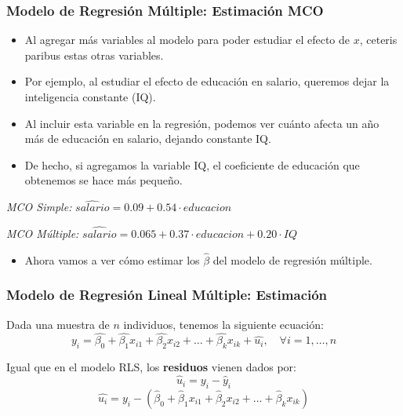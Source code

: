 \documentclass{beamer}
\begin{document}
\begin{frame}
\frametitle{Modelo de Regresión Múltiple: Estimación MCO}

\begin{itemize}
  \item Al agregar más variables al modelo para poder estudiar el efecto de $x$, ceteris paribus estas otras variables.
  
  \item Por ejemplo, al estudiar el efecto de educación en salario, queremos dejar la inteligencia constante (IQ).
  
  \item Al incluir esta variable en la regresión, podemos ver cuánto afecta un año más de educación en salario, dejando constante IQ.
  
  \item De hecho, si agregamos la variable IQ, el coeficiente de educación que obtenemos se hace más pequeño.
\end{itemize}

\begin{center}
    \textit{MCO Simple:} 
    $
    \hat{salario} = 0.09 + 0.54 \cdot educacion
    $ \\
    \vspace{0.5cm} %
    
    \textit{MCO Múltiple:} 
    $
    \hat{salario} = 0.065 + 0.37 \cdot educacion + 0.20 \cdot IQ
    $
\end{center}


\begin{itemize}
  \item Ahora vamos a ver cómo estimar los $\hat{\beta}$ del modelo de regresión múltiple.
\end{itemize}
\end{frame}
\begin{frame}
\frametitle{Modelo de Regresión Lineal Múltiple: Estimación}

Dada una muestra de $n$ individuos, tenemos la siguiente ecuación:
\[
y_i = \hat{\beta_0} + \hat{\beta_1}x_{i1} + \hat{\beta_2}x_{i2} + \ldots + \hat{\beta_k}x_{ik} + \hat{u_i}, \quad \forall i = 1, \ldots, n
\]

 Igual que en el modelo RLS, los \textbf{residuos} vienen dados por:
\[
\hat{u}_i = y_i - \hat{y}_i
\]
\[
 \hat{u_i}= y_i - (\hat{\beta}_0 + \hat{\beta}_1x_{i1} + \hat{\beta}_2x_{i2} + \ldots + \hat{\beta}_kx_{ik})
\]
 \end{frame}
\end{document}
